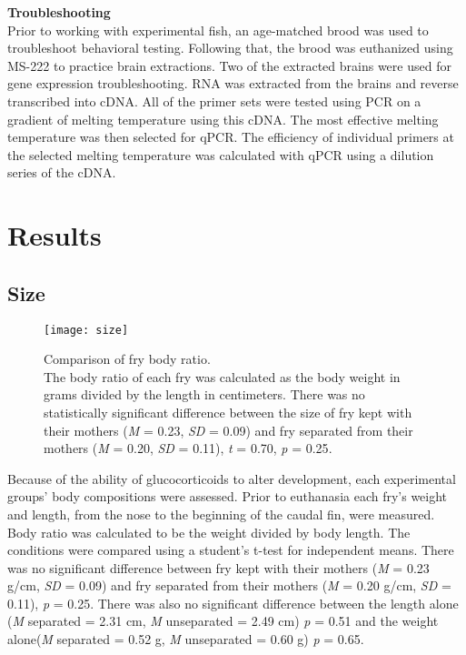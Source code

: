 \documentclass[12pt,twoside]{reedthesis}
\begin{document}
\noindent\textbf{Troubleshooting}\\
Prior to working with experimental fish, an age-matched brood was used to
troubleshoot behavioral testing. Following that, the brood was euthanized using
MS-222 to practice brain extractions. Two of the extracted brains were used for
gene expression troubleshooting. RNA was extracted from the brains and reverse
transcribed into cDNA. All of the primer sets were tested using PCR on a gradient of
melting temperature using this cDNA. The most effective melting temperature was
then selected for qPCR. The efficiency of individual primers at the selected
melting temperature was calculated with qPCR using a dilution series of the cDNA.

\chapter{Results}
\section{Size}

\begin{figure}[htbp] 
\begin{center} 
\texttt{[image: size]}
\caption[Comparison of fry size]{\footnotesize{Comparison of fry body
      ratio. \\ The body ratio of each fry
    was calculated as the body weight in grams divided by the length in
    centimeters. There was no
    statistically significant difference between the size of fry kept with their
    mothers (\textit{M} = 0.23, \textit{SD} = 0.09) and fry separated from their
  mothers (\textit{M} = 0.20, \textit{SD} = 0.11), \textit{t} = 0.70, \textit{p}
= 0.25}.}
\label{subd}
\end{center} 
\end{figure}

Because of the ability of glucocorticoids to alter development, each
experimental groups' body
compositions were assessed. Prior to euthanasia each fry's weight and length, from the nose to the beginning of
the caudal fin, were measured. 
Body ratio was calculated to be the weight divided by body length. The conditions were
compared using a student's t-test for independent means. There was no
significant difference between fry kept with their mothers (\textit{M} = 0.23 g/cm,
\textit{SD} = 0.09) and fry separated from their mothers (\textit{M} = 0.20 g/cm,
\textit{SD} = 0.11), \textit{p} = 0.25. There was also no
significant difference between the length alone (\textit{M} separated = 2.31 cm,
\textit{M} unseparated = 2.49 cm) \textit{p} = 0.51 and the weight
alone(\textit{M} separated = 0.52 g, \textit{M} unseparated = 0.60 g) \textit{p}
= 0.65.  
\end{document}
